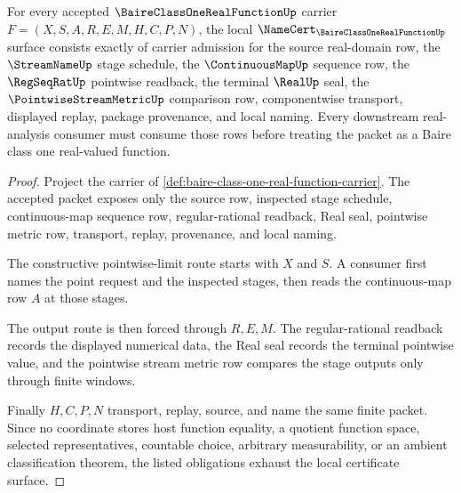 \begin{theorem}
\label{thm:baire-class-one-real-function-namecert-obligations}
For every accepted $\BaireClassOneRealFunctionUp$ carrier $F=(X,S,A,R,E,M,H,C,P,N)$, the local $\NameCert_{\BaireClassOneRealFunctionUp}$ surface consists exactly of carrier admission for the source real-domain row, the $\StreamNameUp$ stage schedule, the $\ContinuousMapUp$ sequence row, the $\RegSeqRatUp$ pointwise readback, the terminal $\RealUp$ seal, the $\PointwiseStreamMetricUp$ comparison row, componentwise transport, displayed replay, package provenance, and local naming. Every downstream real-analysis consumer must consume those rows before treating the packet as a Baire class one real-valued function.
\end{theorem}
\begin{proof}
Project the carrier of \autoref{def:baire-class-one-real-function-carrier}. The accepted packet exposes only the source row, inspected stage schedule, continuous-map sequence row, regular-rational readback, Real seal, pointwise metric row, transport, replay, provenance, and local naming.

The constructive pointwise-limit route starts with $X$ and $S$. A consumer first names the point request and the inspected stages, then reads the continuous-map row $A$ at those stages.

The output route is then forced through $R,E,M$. The regular-rational readback records the displayed numerical data, the Real seal records the terminal pointwise value, and the pointwise stream metric row compares the stage outputs only through finite windows.

Finally $H,C,P,N$ transport, replay, source, and name the same finite packet. Since no coordinate stores host function equality, a quotient function space, selected representatives, countable choice, arbitrary measurability, or an ambient classification theorem, the listed obligations exhaust the local certificate surface.
\end{proof}

